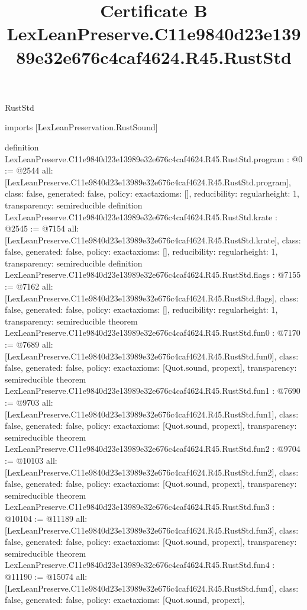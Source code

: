 \begin{lexlean}{RustStd}
\title{Certificate B LexLeanPreserve.C11e9840d23e13989e32e676c4caf4624.R45.RustStd}
\begin{coremodule}
imports [LexLeanPreservation.RustSound]

definition LexLeanPreserve.C11e9840d23e13989e32e676c4caf4624.R45.RustStd.program : @0 := @2544 {
  all: [LexLeanPreserve.C11e9840d23e13989e32e676c4caf4624.R45.RustStd.program],
  class: false,
  generated: false,
  policy: exact{axioms: []},
  reducibility: regular{height: 1},
  transparency: semireducible
}
definition LexLeanPreserve.C11e9840d23e13989e32e676c4caf4624.R45.RustStd.krate : @2545 := @7154 {
  all: [LexLeanPreserve.C11e9840d23e13989e32e676c4caf4624.R45.RustStd.krate],
  class: false,
  generated: false,
  policy: exact{axioms: []},
  reducibility: regular{height: 1},
  transparency: semireducible
}
definition LexLeanPreserve.C11e9840d23e13989e32e676c4caf4624.R45.RustStd.flags : @7155 := @7162 {
  all: [LexLeanPreserve.C11e9840d23e13989e32e676c4caf4624.R45.RustStd.flags],
  class: false,
  generated: false,
  policy: exact{axioms: []},
  reducibility: regular{height: 1},
  transparency: semireducible
}
theorem LexLeanPreserve.C11e9840d23e13989e32e676c4caf4624.R45.RustStd.fun0 : @7170 := @7689 {
  all: [LexLeanPreserve.C11e9840d23e13989e32e676c4caf4624.R45.RustStd.fun0],
  class: false,
  generated: false,
  policy: exact{axioms: [Quot.sound, propext]},
  transparency: semireducible
}
theorem LexLeanPreserve.C11e9840d23e13989e32e676c4caf4624.R45.RustStd.fun1 : @7690 := @9703 {
  all: [LexLeanPreserve.C11e9840d23e13989e32e676c4caf4624.R45.RustStd.fun1],
  class: false,
  generated: false,
  policy: exact{axioms: [Quot.sound, propext]},
  transparency: semireducible
}
theorem LexLeanPreserve.C11e9840d23e13989e32e676c4caf4624.R45.RustStd.fun2 : @9704 := @10103 {
  all: [LexLeanPreserve.C11e9840d23e13989e32e676c4caf4624.R45.RustStd.fun2],
  class: false,
  generated: false,
  policy: exact{axioms: [Quot.sound, propext]},
  transparency: semireducible
}
theorem LexLeanPreserve.C11e9840d23e13989e32e676c4caf4624.R45.RustStd.fun3 : @10104 := @11189 {
  all: [LexLeanPreserve.C11e9840d23e13989e32e676c4caf4624.R45.RustStd.fun3],
  class: false,
  generated: false,
  policy: exact{axioms: [Quot.sound, propext]},
  transparency: semireducible
}
theorem LexLeanPreserve.C11e9840d23e13989e32e676c4caf4624.R45.RustStd.fun4 : @11190 := @15074 {
  all: [LexLeanPreserve.C11e9840d23e13989e32e676c4caf4624.R45.RustStd.fun4],
  class: false,
  generated: false,
  policy: exact{axioms: [Quot.sound, propext]},
}
\end{coremodule}
\end{lexlean}
